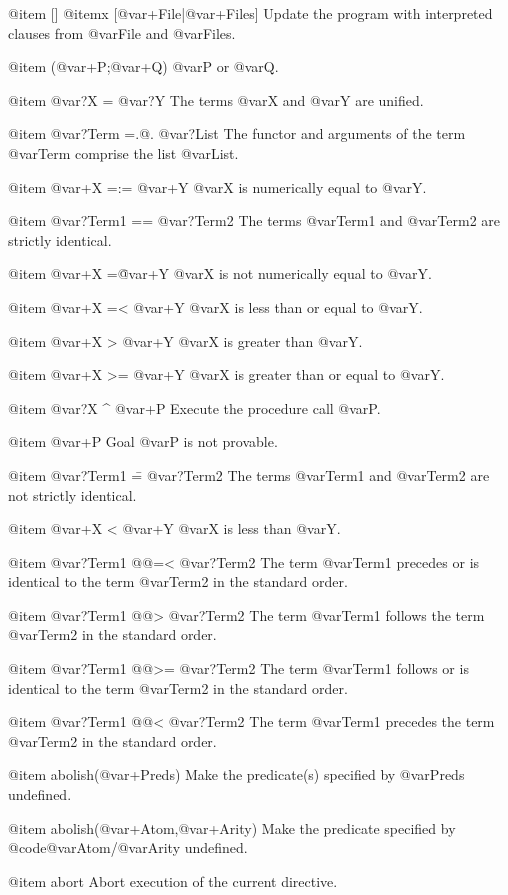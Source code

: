 {{{{{@item []
@itemx [@var{+File}|@var{+Files}]
Update the program with interpreted clauses from @var{File} and @var{Files}.

@item (@var{+P};@var{+Q})
@var{P} or @var{Q}.

@item @var{?X} = @var{?Y}
The terms @var{X} and @var{Y} are unified.

@item @var{?Term} =.@. @var{?List}
The functor and arguments of the term @var{Term} comprise the list
@var{List}.

@item @var{+X} =:= @var{+Y}
@var{X} is numerically equal to @var{Y}.

@item @var{?Term1} == @var{?Term2}
The terms @var{Term1} and @var{Term2} are strictly identical.

@item @var{+X} =\= @var{+Y}
@var{X} is not numerically equal to @var{Y}.

@item @var{+X} =< @var{+Y}
@var{X} is less than or equal to @var{Y}.

@item @var{+X} > @var{+Y}
@var{X} is greater than @var{Y}.

@item @var{+X} >= @var{+Y}
@var{X} is greater than or equal to @var{Y}.

@item @var{?X} ^ @var{+P}
Execute the procedure call @var{P}.

@item \+ @var{+P}
Goal @var{P} is not provable.

@item @var{?Term1} \== @var{?Term2}
The terms @var{Term1} and @var{Term2} are not strictly identical.

@item @var{+X} < @var{+Y}
@var{X} is less than @var{Y}.

@item @var{?Term1} @@=< @var{?Term2}
The term @var{Term1} precedes or is identical to the term @var{Term2} in
the standard order.

@item @var{?Term1} @@> @var{?Term2}
The term @var{Term1} follows the term @var{Term2} in the standard order.

@item @var{?Term1} @@>= @var{?Term2}
The term @var{Term1} follows or is identical to the term @var{Term2} in
the standard order.

@item @var{?Term1} @@< @var{?Term2}
The term @var{Term1} precedes the term @var{Term2} in the standard
order.

@item abolish(@var{+Preds})
Make the predicate(s) specified by @var{Preds} undefined.

@item abolish(@var{+Atom},@var{+Arity})
Make the predicate specified by @code{@var{Atom}/@var{Arity}} undefined.

@item abort
Abort execution of the current directive.

}}}}}
